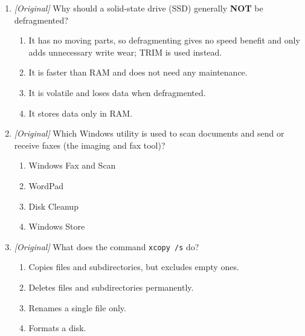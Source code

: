 \begin{enumerate}[label=\textbf{Q\arabic*.}, leftmargin=*]
\begin{enumerate}[label=\Alph*.]
    \item Disk Defragmenter
    \item Device Manager
    \item Task Scheduler
  \end{enumerate}
\item \textit{[Original]} Why should a solid-state drive (SSD) generally
  \textbf{NOT} be defragmented?
  \begin{enumerate}[label=\Alph*.]
    \item It has no moving parts, so defragmenting gives no speed benefit and
      only adds unnecessary write wear; TRIM is used instead.
    \item It is faster than RAM and does not need any maintenance.
    \item It is volatile and loses data when defragmented.
    \item It stores data only in RAM.
  \end{enumerate}
\item \textit{[Original]} Which Windows utility is used to scan documents and
  send or receive faxes (the imaging and fax tool)?
  \begin{enumerate}[label=\Alph*.]
    \item Windows Fax and Scan
    \item WordPad
    \item Disk Cleanup
    \item Windows Store
  \end{enumerate}
\item \textit{[Original]} What does the command \texttt{xcopy /s} do?
  \begin{enumerate}[label=\Alph*.]
    \item Copies files and subdirectories, but excludes empty ones.
    \item Deletes files and subdirectories permanently.
    \item Renames a single file only.
    \item Formats a disk.
  \end{enumerate}


\end{enumerate}
